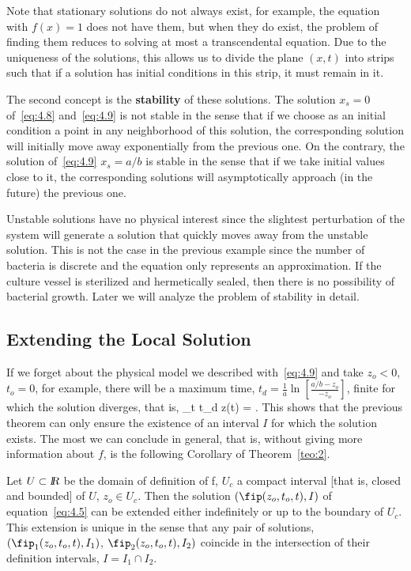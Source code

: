 Note that stationary solutions do not always exist, for example, the equation with $f(x)=1$ does not have them, but when they do exist, the problem of finding them reduces to solving at most a transcendental equation.
Due to the uniqueness of the solutions, this allows us to divide the
plane $(x,t)$ into strips such that if a solution has initial conditions in this strip, it must remain in it.

The second concept is the {\bf stability} of these solutions.
The solution $x_s=0$ of~\ref{eq:4.8} and~\ref{eq:4.9} is not stable in the sense that if we choose as an initial condition a point in any neighborhood of this solution, the corresponding solution will initially move away exponentially from the previous one. On the contrary, the solution of~\ref{eq:4.9} $x_s=a/b$ is stable in the sense that if we take initial values close to it, the corresponding solutions will asymptotically approach (in the future) the previous one.

Unstable solutions have no physical interest since the slightest perturbation of the system will generate a solution that quickly moves away from the unstable solution. 
This is not the case in the previous example since the number of bacteria is discrete and the equation only represents an approximation. 
If the culture vessel is sterilized and hermetically sealed, then there is no possibility of bacterial growth.
Later we will analyze the problem of stability in detail.

\subsection{Extending the Local Solution}

If we forget about the physical model we described with~\ref{eq:4.9} 
and take
$z_o < 0$, $t_o = 0$, for example, there will be a maximum time, 
$t_d = \frac1a \ln [\frac{a/b - z_o}{- z_o}]$,  
finite for which the solution diverges, that is,
\beq 
\lim_{t \rightarrow t_d} z(t) = \infty . 
\eeq
This shows that the previous theorem can only ensure the
existence of an interval $I$ for which the solution exists. The
most we can conclude in general, that is, without giving more information about $f$, is the following Corollary of
Theorem~\ref{teo:2}.

\begin{cor}
Let $U \subset  \mbox{\sl {l$\!\!\!\;\:\!$R}} $ be the domain of definition of f, $U_c $ a
compact interval [that is, closed and bounded] of $U$, $z_o \in U_c $.
Then the solution $(\fip (z_o,t_o,t), I)$ of equation~\ref{eq:4.5} can be extended either indefinitely or up to
the boundary of $U_c $. 
This extension is unique in the sense that any pair of solutions,
$(\fip_1(z_o,t_o,t), I_1 )$, $\fip_2(z_o,t_o,t), I_2 )$ coincide in
the intersection of their definition intervals, $I = I_1 \cap
I_2$. 
\label{cor:4_2}
\end{cor}

